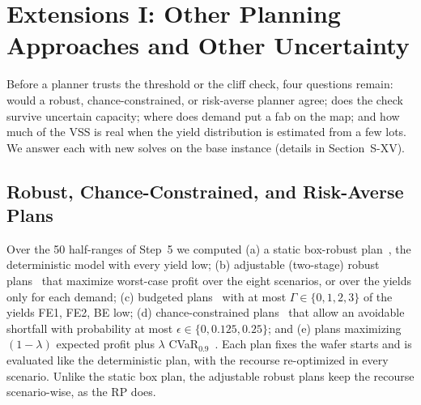 \section{Extensions I: Other Planning Approaches and Other Uncertainty}
\label{sec:extA}

Before a planner trusts the threshold or the cliff check, four questions remain: would a robust, chance-constrained, or risk-averse planner agree; does the check survive uncertain capacity; where does demand put a fab on the map; and how much of the VSS is real when the yield distribution is estimated from a few lots. We answer each with new solves on the base instance (details in Section~\mbox{S-XV}).

\subsection{Robust, Chance-Constrained, and Risk-Averse Plans}
\label{sec:extA-paradigms}

Over the 50 half-ranges of Step~5 we computed (a) a static box-robust plan~\cite{soyster1973}, the deterministic model with every yield low; (b) adjustable (two-stage) robust plans~\cite{bental2004adjustable} that maximize worst-case profit over the eight scenarios, or over the yields only for each demand; (c) budgeted plans~\cite{bertsimas2004} with at most $\Gamma\in\{0,1,2,3\}$ of the yields FE1, FE2, BE low; (d) chance-constrained plans~\cite{charnes1959,luedtke2008sample} that allow an avoidable shortfall with probability at most $\epsilon\in\{0,0.125,0.25\}$; and (e) plans maximizing $(1-\lambda)$ expected profit plus $\lambda$ CVaR$_{0.9}$~\cite{rockafellar2000}. Each plan fixes the wafer starts and is evaluated like the deterministic plan, with the recourse re-optimized in every scenario. Unlike the static box plan, the adjustable robust plans keep the recourse scenario-wise, as the RP does.

